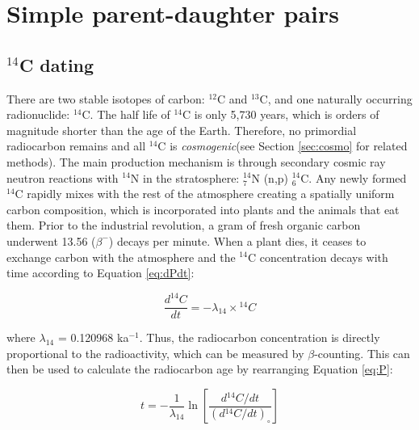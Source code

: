 \chapter{Simple parent-daughter pairs}
\label{ch:intro2PD}

\section{$^{14}$C dating}
\label{sec:14C}

There are two stable isotopes of carbon: $^{12}$C and $^{13}$C, and
one naturally occurring radionuclide: $^{14}$C. The half life of
$^{14}$C is only 5,730 years, which is orders of magnitude shorter
than the age of the Earth. Therefore, no primordial radiocarbon
remains and all $^{14}$C is \emph{cosmogenic}\ifuclnotes (see Section
\ref{sec:cosmo} for related methods)\fi.  The main production
mechanism is through secondary cosmic ray neutron reactions with
$^{14}$N in the stratosphere: $^{14}_7$N (n,p) $^{14}_6$C. Any newly
formed $^{14}$C rapidly mixes with the rest of the atmosphere creating
a spatially uniform carbon composition, which is incorporated into
plants and the animals that eat them. Prior to the industrial
revolution, a gram of fresh organic carbon underwent 13.56 ($\beta^-$)
decays per minute. When a plant dies, it ceases to exchange carbon
with the atmosphere and the $^{14}$C concentration decays with time
according to Equation \ref{eq:dPdt}:

\begin{equation}
\frac{d^{14}C}{dt} = -\lambda_{14} \times {}^{14}C
\label{eq:d14Cdt}
\end{equation}

where $\lambda_{14}$ = 0.120968 ka$^{-1}$. Thus, the radiocarbon
concentration is directly proportional to the radioactivity, which can
be measured by $\beta$-counting. This can then be used to calculate
the radiocarbon age by rearranging Equation \ref{eq:P}:

\begin{equation}
t = -\frac{1}{\lambda_{14}}
\ln\left[\frac{d{}^{14}C/dt}{(d{}^{14}C/dt)_\circ}\right]
\label{eq:t14C}
\end{equation}

